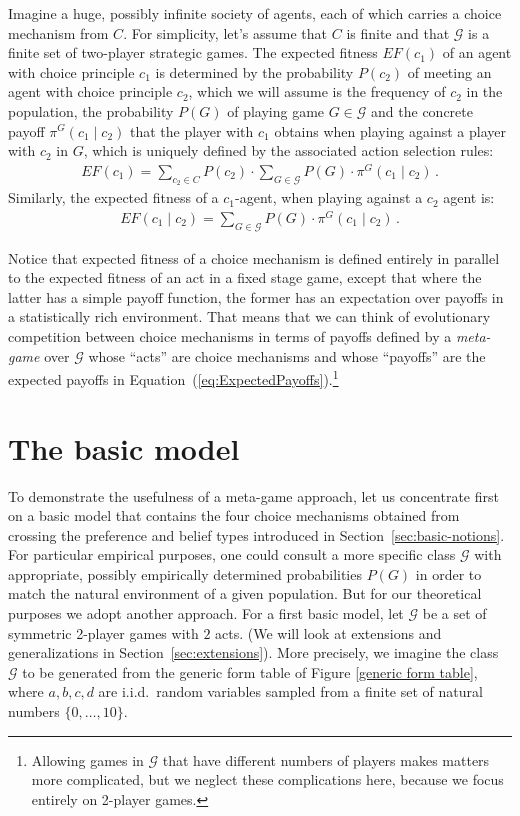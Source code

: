 \documentclass[fleqn,reqno,11pt]{article}
\begin{document}
Imagine a huge, possibly infinite society of agents, each of which carries a choice mechanism
from $C$. For simplicity, let's assume that $C$ is finite and that $\mathcal{G}$ is
a finite set of two-player strategic games. The expected fitness $EF(c_1)$ of an agent with
choice principle $c_1$ is determined by the probability $P(c_2)$ of meeting an agent with
choice principle $c_2$, which we will assume is the frequency of $c_2$ in the population, the
probability $P(G)$ of playing game $G \in \mathcal{G}$ and the concrete payoff
$\pi^G(c_1 \mid c_2)$ that the player with $c_1$ obtains when playing against a player with
$c_2$ in $G$, which is uniquely defined by the associated action selection rules:
\begin{align*}
  EF(c_1) = \sum_{c_2 \in C} P(c_2) \cdot \sum_{G \in \mathcal{G}}  P(G) \cdot \pi^G(c_1 \mid c_2)\,.
\end{align*}
Similarly, the expected fitness of a $c_1$-agent, when playing against a $c_2$ agent is:
\begin{align}
  \label{eq:ExpectedPayoffs}
  EF(c_1 \mid c_2) = \sum_{G \in \mathcal{G}}  P(G) \cdot \pi^G(c_1 \mid c_2)\,.
\end{align}

Notice that expected fitness of a choice mechanism is defined entirely in parallel to the
expected fitness of an act in a fixed stage game, except that where the latter has a simple
payoff function, the former has an expectation over payoffs in a statistically rich
environment. That means that we can think of evolutionary competition between choice mechanisms
in terms of payoffs defined by a \emph{meta-game} over $\mathcal{G}$ whose ``acts'' are choice
mechanisms and whose ``payoffs'' are the expected payoffs in
Equation~(\ref{eq:ExpectedPayoffs}).\footnote{Allowing games in $\mathcal{G}$ that have
  different numbers of players makes matters more complicated, but we neglect these
  complications here, because we focus entirely on 2-player games.}


\section{The basic model}
\label{sec:basic-model-1}

To demonstrate the usefulness of a meta-game approach, let us concentrate first on a basic
model that contains the four choice mechanisms obtained from crossing the preference and belief
types introduced in Section~\ref{sec:basic-notions}.  For particular empirical purposes, one
could consult a more specific class $\mathcal{G}$ with appropriate, possibly empirically
determined probabilities $P(G)$ in order to match the natural environment of a given
population. But for our theoretical purposes we adopt another approach. For a first basic
model, let $\mathcal{G}$ be a set of symmetric 2-player games with $2$ acts. (We will look at
extensions and generalizations in Section~\ref{sec:extensions}). More precisely, we imagine the
class $\mathcal{G}$ to be generated from the generic form table of Figure \ref{generic form
  table}, where $a,b,c,d$ are i.i.d.~random variables sampled from a finite set of natural
numbers $ \lbrace 0, \dots, 10 \rbrace$.
\end{document}
